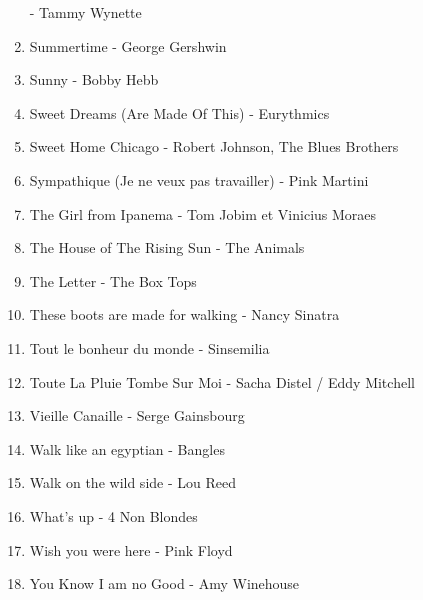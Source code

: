 \documentclass[12pt]{extarticle}
\begin{document}
\begin{multicols}{2}
\begin{enumerate}[nolistsep]
        - Tammy Wynette
\item   Summertime
        - George Gershwin
\item   Sunny
        - Bobby Hebb
\item   Sweet Dreams (Are Made Of This)
        - Eurythmics
\item   Sweet Home Chicago
        - Robert Johnson, The Blues Brothers
\item   Sympathique (Je ne veux pas travailler)
        - Pink Martini
\item   The Girl from Ipanema
        - Tom Jobim et Vinicius Moraes
\item   The House of The Rising Sun
        - The Animals
\item   The Letter
        - The Box Tops
\item   These boots are made for walking
        - Nancy Sinatra
\item   Tout le bonheur du monde
        - Sinsemilia
\item   Toute La Pluie Tombe Sur Moi
        - Sacha Distel / Eddy Mitchell
\item   Vieille Canaille
        - Serge Gainsbourg
\item   Walk like an egyptian
        - Bangles
\item   Walk on the wild side
        - Lou Reed
\item   What's up
        - 4 Non Blondes
\item   Wish you were here
        - Pink Floyd
\item   You Know I am no Good
        - Amy Winehouse
\end{enumerate}
\end{multicols}
\end{document}
